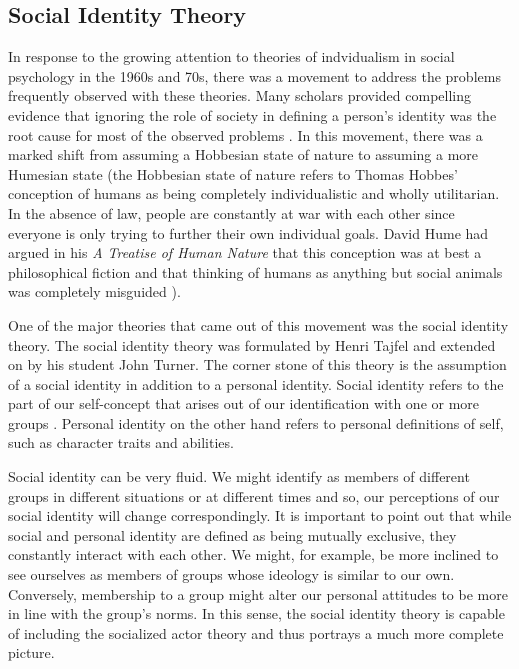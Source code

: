 \documentclass[rutwik_proposal.tex]{subfiles}
\begin{document}
\subsection{Social Identity Theory}\label{subsec:socidentity}

In response to the growing attention to theories of indvidualism in social psychology in the 1960s and 70s, there was a movement to address the problems frequently observed with these theories. Many scholars provided compelling evidence that ignoring the role of society in defining a person's identity was the root cause for most of the observed problems \cite{Brewer79, Cancian75}. In this movement, there was a marked shift from assuming a Hobbesian state of nature to assuming a more Humesian state (the Hobbesian state of nature refers to Thomas Hobbes' conception of humans as being completely individualistic and wholly utilitarian. In the absence of law, people are constantly at war with each other since everyone is only trying to further their own individual goals. David Hume had argued in his \textit{A Treatise of Human Nature} that this conception was at best a philosophical fiction and that thinking of humans as anything but social animals was completely misguided \cite{Hume1739}).

One of the major theories that came out of this movement was the social identity theory. The social identity theory was formulated by Henri Tajfel and extended on by his student John Turner. The corner stone of this theory is the assumption of a social identity in addition to a personal identity. Social identity refers to the part of our self-concept that arises out of our identification with one or more groups \cite{Tajfel81, Turner86}. Personal identity on the other hand refers to personal definitions of self, such as character traits and abilities. 

Social identity can be very fluid. We might identify as members of different groups in different situations or at different times and so, our perceptions of our social identity will change correspondingly. It is important to point out that while social and personal identity are defined as being mutually exclusive, they constantly interact with each other. We might, for example, be more inclined to see ourselves as members of groups whose ideology is similar to our own. Conversely, membership to a group might alter our personal attitudes to be more in line with the group's norms. In this sense, the social identity theory is capable of including the socialized actor theory and thus portrays a much more complete picture.
\end{document}
